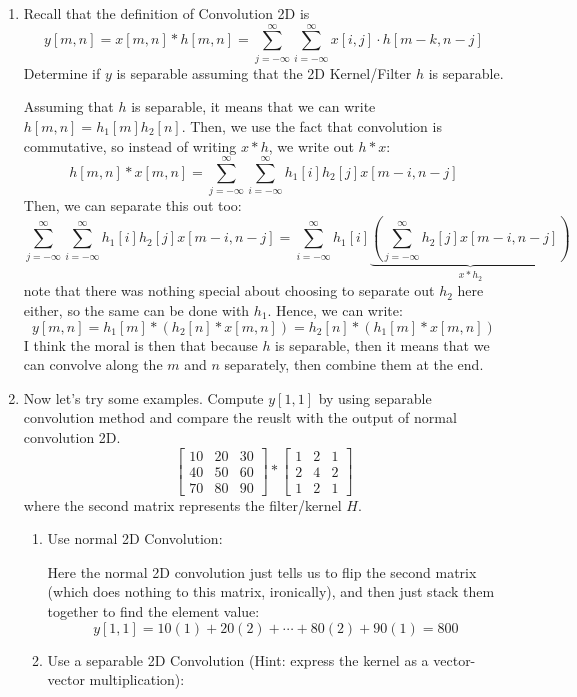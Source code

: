 \documentclass[10pt]{article}
\begin{document}
	\begin{enumerate}[label=\alph*)]
		\item Recall that the definition of Convolution 2D is
			\[
				y[m, n] = x[m, n] * h[m,n] = \sum_{j=-\infty}^{\infty} \sum_{i=-\infty}^{\infty} x[i, j] 
				\cdot h[m - k, n - j]
			\] 
			Determine if \( y \) is separable assuming that the 2D Kernel/Filter \( h \) is separable. 

			\begin{solution}
				Assuming that \( h \) is separable, it means that we can write \( h[m, n] = h_1[m] h_2[n] \). Then, 
				we use the fact that convolution is commutative, so instead of writing  \( x * h \), we write 
				out \( h * x \):
				\[
					h[m, n] * x[m, n] = \sum_{j=-\infty}^{\infty} \sum_{i=-\infty}^{\infty} h_1[i] h_2[j] x[m - i, 
					n - j]
				\] 
				Then, we can separate this out too:
				\[
					\sum_{j=-\infty}^{\infty} \sum_{i=-\infty}^{\infty} h_1[i] h_2[j] x[m - i, n - j] = 
					\sum_{i=-\infty}^{\infty} h_1[i] \underbrace{\left( \sum_{j=-\infty}^{\infty} h_2[j] x[m - i, n -j] \right) }_{x * h_2}
				\] 
				note that there was nothing special about choosing to separate out \( h_2 \) here either, 
				so the same can be done with  \( h_1 \). Hence, we can write:
				\[
					y[m, n] = h_1[m] * (h_2[n] * x[m, n]) = h_2[n] * (h_1[m] * x[m, n])
				\] 
				I think the moral is then that because \( h \) is separable, then it means that we can convolve 
				along the \( m \) and \( n \) separately, then combine them at the end.  
			\end{solution}
		\item Now let's try some examples. Compute \( y[1, 1] \) by using separable convolution method and 
			compare the reuslt with the output of normal convolution 2D. 
			\[
				\begin{bmatrix} 10 & 20 & 30\\ 40 & 50 & 60\\ 70 & 80 & 90 \end{bmatrix} * 
				\begin{bmatrix} 1 & 2 & 1\\ 2 & 4& 2\\ 1& 2& 1 \end{bmatrix} 
			\] 
			where the second matrix represents the filter/kernel \( H \). 
			\begin{enumerate}[label=\roman*)]
				\item Use normal 2D Convolution: 

					\begin{solution}
						Here the normal 2D convolution just tells us to flip the second matrix (which does nothing 
						to this matrix, ironically), and then just stack them together to find the element value: 
						\[
							y[1, 1] = 10(1) + 20(2) + \cdots + 80 (2) + 90(1) = 800
						\] 
					\end{solution}
				\item Use a separable 2D Convolution (Hint: express the kernel as a vector-vector multiplication):


\end{enumerate}
\end{enumerate}
\end{document}

